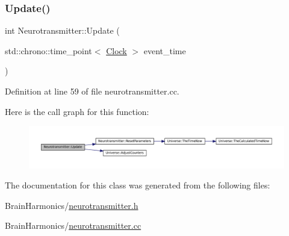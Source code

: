\subsubsection{\texorpdfstring{Update()}{Update()}}
{\footnotesize\ttfamily int Neurotransmitter\+::\+Update (\begin{DoxyParamCaption}\item[{std\+::chrono\+::time\+\_\+point$<$ \mbox{\hyperlink{universe_8h_a0ef8d951d1ca5ab3cfaf7ab4c7a6fd80}{Clock}} $>$}]{event\+\_\+time }\end{DoxyParamCaption})}



Definition at line 59 of file neurotransmitter.\+cc.

Here is the call graph for this function\+:\nopagebreak
\begin{figure}[H]
\begin{center}
\leavevmode
\includegraphics[width=350pt]{class_neurotransmitter_ac9f7be22ca7242207de76ec5e1b055b1_cgraph}
\end{center}
\end{figure}


The documentation for this class was generated from the following files\+:\begin{DoxyCompactItemize}
\item 
Brain\+Harmonics/\mbox{\hyperlink{neurotransmitter_8h}{neurotransmitter.\+h}}\item 
Brain\+Harmonics/\mbox{\hyperlink{neurotransmitter_8cc}{neurotransmitter.\+cc}}\end{DoxyCompactItemize}

